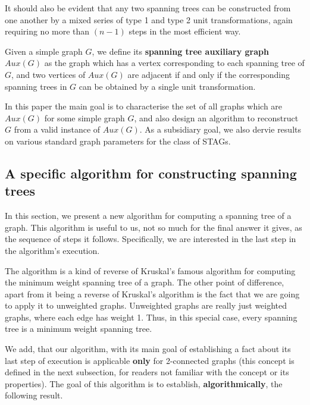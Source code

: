 \documentclass{llncs}
\begin{document}
It should also be evident that any two spanning trees can be constructed from one another by a mixed series of type 1 and type 2 unit transformations, again requiring no more than $(n-1)$ steps in the most efficient way.

\begin{definition} 
	Given a simple graph $G$, we define its {\bf spanning tree auxiliary graph $Aux(G)$} as the graph which has a vertex corresponding to each spanning tree of $G$, and two vertices of $Aux(G)$ are adjacent if and only if the corresponding spanning trees in $G$ can be obtained by a single unit transformation. 
\end{definition}
In this paper the main goal is to characterise the set of all graphs which are $Aux(G)$ for some simple graph $G$, and also design an algorithm to reconstruct $G$ from a valid instance of $Aux(G)$. As a subsidiary goal, we also dervie results on various standard graph parameters for the class of STAGs.
\subsection{A specific algorithm for constructing spanning trees}
In this section, we present a new algorithm for computing a spanning tree of a graph. This algorithm is useful to us, not so much for the final answer it gives, as the sequence of steps it follows. Specifically, we are interested in the last step in the algorithm's execution.

The algorithm is a kind of reverse of Kruskal's famous algorithm for computing the minimum weight spanning tree of a graph. The other point of difference, apart from it being a reverse of Kruskal's algorithm is the fact that we are going to apply it to unweighted graphs. Unweighted graphs are really just weighted graphs, where each edge has weight 1. Thus, in this special case, every spanning tree is a minimum weight spanning tree. 

We add, that our algorithm, with its main goal of establishing a fact about its last step of execution is applicable {\bf only} for 2-connected graphs (this concept is defined in the next subsection, for readers not familiar with the concept or its properties). The goal of this algorithm is to establish, {\bf algorithmically}, the following result. 
\end{document}
